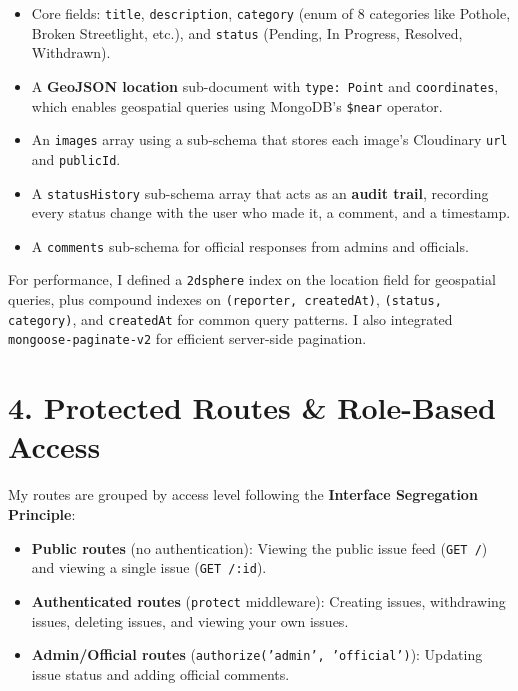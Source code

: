 \documentclass[12pt,a4paper]{article}
\begin{document}
\begin{itemize}[nosep]
    \item Core fields: \texttt{title}, \texttt{description}, \texttt{category} (enum of 8 categories like Pothole, Broken Streetlight, etc.), and \texttt{status} (Pending, In Progress, Resolved, Withdrawn).
    \item A \textbf{GeoJSON location} sub-document with \texttt{type: Point} and \texttt{coordinates}, which enables geospatial queries using MongoDB's \texttt{\$near} operator.
    \item An \texttt{images} array using a sub-schema that stores each image's Cloudinary \texttt{url} and \texttt{publicId}.
    \item A \texttt{statusHistory} sub-schema array that acts as an \textbf{audit trail}, recording every status change with the user who made it, a comment, and a timestamp.
    \item A \texttt{comments} sub-schema for official responses from admins and officials.
\end{itemize}

For performance, I defined a \texttt{2dsphere} index on the location field for geospatial queries, plus compound indexes on \texttt{(reporter, createdAt)}, \texttt{(status, category)}, and \texttt{createdAt} for common query patterns. I also integrated \texttt{mongoose-paginate-v2} for efficient server-side pagination.

\section{4. Protected Routes \& Role-Based Access}

My routes are grouped by access level following the \textbf{Interface Segregation Principle}:

\begin{itemize}[nosep]
    \item \textbf{Public routes} (no authentication): Viewing the public issue feed (\texttt{GET /}) and viewing a single issue (\texttt{GET /:id}).
    \item \textbf{Authenticated routes} (\texttt{protect} middleware): Creating issues, withdrawing issues, deleting issues, and viewing your own issues.
    \item \textbf{Admin/Official routes} (\texttt{authorize('admin', 'official')}): Updating issue status and adding official comments.
\end{itemize}
\end{document}
